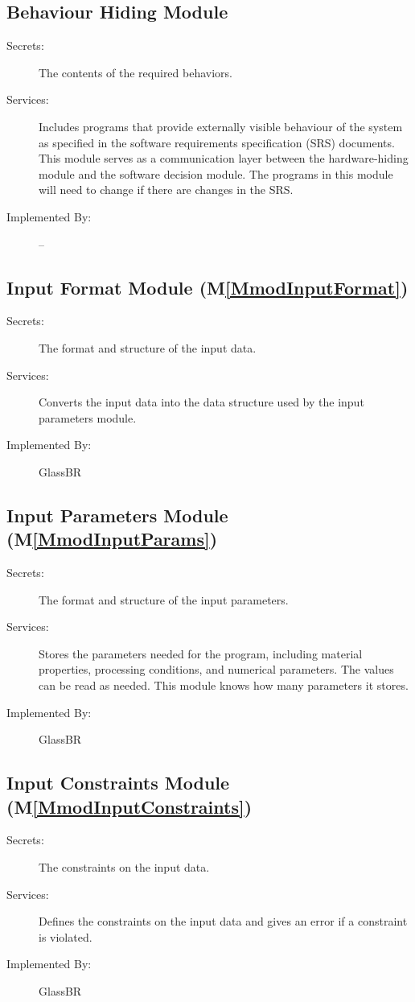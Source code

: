 \documentclass[12pt]{article}
\begin{document}
\subsection{Behaviour Hiding Module}
\label{Sec:BHM}
\begin{description}
\item[Secrets:]The contents of the required behaviors.
\item[Services:]Includes programs that provide externally visible behaviour of the system as specified in the software requirements specification (SRS) documents. This module serves as a communication layer between the hardware-hiding module and the software decision module. The programs in this module will need to change if there are changes in the SRS.
\item[Implemented By:]--
\end{description}
\subsection{Input Format Module (M\ref{MmodInputFormat})}
\label{Sec:IFM()}
\begin{description}
\item[Secrets:]The format and structure of the input data.
\item[Services:]Converts the input data into the data structure used by the input parameters module.
\item[Implemented By:]GlassBR
\end{description}
\subsection{Input Parameters Module (M\ref{MmodInputParams})}
\label{Sec:IPM()}
\begin{description}
\item[Secrets:]The format and structure of the input parameters.
\item[Services:]Stores the parameters needed for the program, including material properties, processing conditions, and numerical parameters. The values can be read as needed. This module knows how many parameters it stores.
\item[Implemented By:]GlassBR
\end{description}
\subsection{Input Constraints Module (M\ref{MmodInputConstraints})}
\label{Sec:ICM()}
\begin{description}
\item[Secrets:]The constraints on the input data.
\item[Services:]Defines the constraints on the input data and gives an error if a constraint is violated.
\item[Implemented By:]GlassBR
\end{description}
\end{document}
